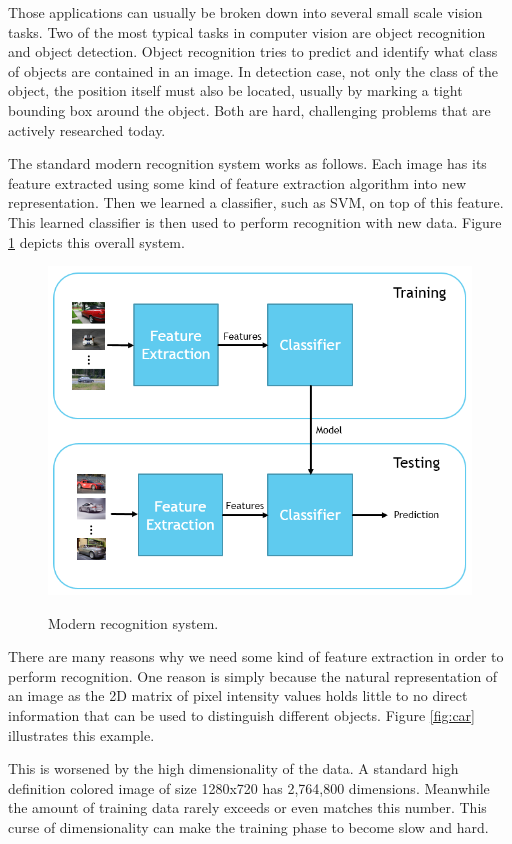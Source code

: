 \documentclass[a4paper,11pt]{kth-mag}
\begin{document}
Those applications can usually be broken down into several small scale vision tasks. Two of the most typical tasks in computer vision are object recognition and object detection. Object recognition tries to predict and identify what class of objects are contained in an image. In detection case, not only the class of the object, the position itself must also be located, usually by marking a tight bounding box around the object. Both are hard, challenging problems that are actively researched today.

The standard modern recognition system works as follows. Each image has its feature extracted using some kind of feature extraction algorithm into new representation. Then we learned a classifier, such as SVM, on top of this feature. This learned classifier is then used to perform recognition with new data. Figure \ref{fig:scheme} depicts this overall system.

\begin{figure}[h]
\centering
\includegraphics[scale=0.5]{image/scheme.png}
\label{fig:scheme}
\caption{Modern recognition system.}
\end{figure}

There are many reasons why we need some kind of feature extraction in order to perform recognition. One reason is simply because the natural representation of an image as the 2D matrix of pixel intensity values holds little to no direct information that can be used to distinguish different objects. Figure \ref{fig:car} illustrates this example. 

This is worsened by the high dimensionality of the data. A standard high definition colored image of size 1280x720 has 2,764,800 dimensions. Meanwhile the amount of training data rarely exceeds or even matches this number. This curse of dimensionality can make the training phase to become slow and hard.
\end{document}
